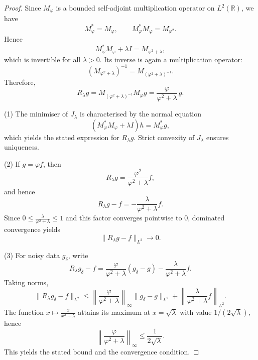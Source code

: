 \documentclass[10pt,a4paper]{amsart}
\newcommand{\R}{\mathbb{R}}
\begin{document}
\begin{proof}
Since $M_\varphi$ is a bounded self-adjoint multiplication operator on
$L^2(\R)$, we have
\[
M_\varphi^* = M_\varphi,
\qquad
M_\varphi^* M_\varphi = M_{\varphi^2}.
\]
Hence
\[
M_\varphi^* M_\varphi + \lambda I
=
M_{\varphi^2 + \lambda},
\]
which is invertible for all $\lambda>0$. Its inverse is again a
multiplication operator:
\[
(M_{\varphi^2 + \lambda})^{-1}
=
M_{(\varphi^2 + \lambda)^{-1}}.
\]
Therefore,
\[
R_\lambda g
=
M_{(\varphi^2 + \lambda)^{-1}} M_\varphi g
=
\frac{\varphi}{\varphi^2 + \lambda}\, g.
\]

\medskip
\noindent
(1) The minimiser of $J_\lambda$ is characterised by the normal equation
\[
(M_\varphi^* M_\varphi + \lambda I)h = M_\varphi^* g,
\]
which yields the stated expression for $R_\lambda g$. Strict convexity of
$J_\lambda$ ensures uniqueness.

\medskip
\noindent
(2) If $g=\varphi f$, then
\[
R_\lambda g
=
\frac{\varphi^2}{\varphi^2 + \lambda} f,
\]
and hence
\[
R_\lambda g - f
=
-\frac{\lambda}{\varphi^2 + \lambda} f.
\]
Since $0 \le \frac{\lambda}{\varphi^2 + \lambda} \le 1$ and this factor
converges pointwise to $0$, dominated convergence yields
\[
\|R_\lambda g - f\|_{L^2} \to 0.
\]

\medskip
\noindent
(3) For noisy data $g_\delta$, write
\[
R_\lambda g_\delta - f
=
\frac{\varphi}{\varphi^2 + \lambda}(g_\delta - g)
-
\frac{\lambda}{\varphi^2 + \lambda} f.
\]
Taking norms,
\[
\|R_\lambda g_\delta - f\|_{L^2}
\le
\left\|
\frac{\varphi}{\varphi^2 + \lambda}
\right\|_\infty
\|g_\delta - g\|_{L^2}
+
\left\|
\frac{\lambda}{\varphi^2 + \lambda} f
\right\|_{L^2}.
\]
The function $x \mapsto \frac{x}{x^2 + \lambda}$ attains its maximum at
$x=\sqrt{\lambda}$ with value $1/(2\sqrt{\lambda})$, hence
\[
\left\|
\frac{\varphi}{\varphi^2 + \lambda}
\right\|_\infty
\le
\frac{1}{2\sqrt{\lambda}}.
\]
This yields the stated bound and the convergence condition.
\end{proof}
\end{document}

